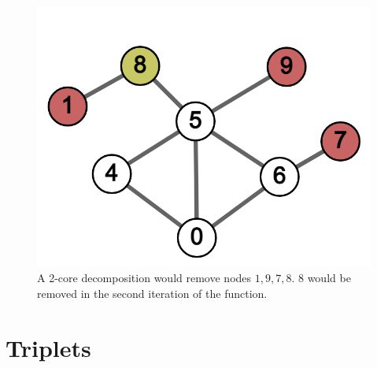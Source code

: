 \begin{figure}[H]
  \includegraphics[width=\linewidth]{img/core_ex.png}
  \caption{A 2-core decomposition would remove nodes $1,9,7,8$. $8$ would be removed in the second iteration of the function.}
  \label{fig:core_ex}
\end{figure}

\section{Triplets}

